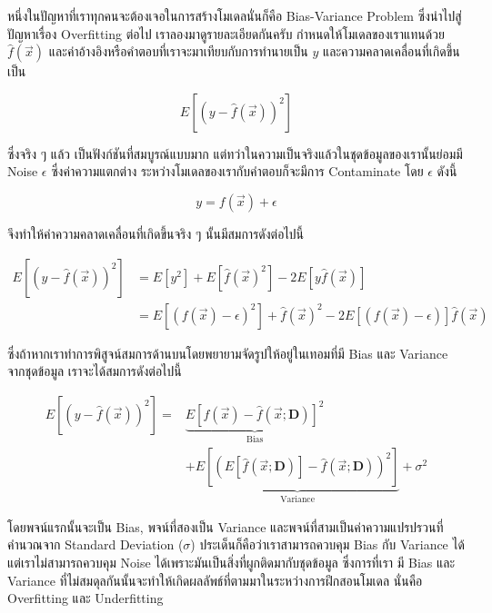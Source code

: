 หนึ่งในปัญหาที่เราทุกคนจะต้องเจอในการสร้างโมเดลนั่นก็คือ Bias-Variance Problem ซึ่งนำไปสู่ปัญหาเรื่อง Overfitting ต่อไป
เราลองมาดูรายละเอียดกันครับ กำหนดให้โมเดลของเราแทนด้วย $\hat{f}(\vec{x})$ และค่าอ้างอิงหรือคำตอบที่เราจะมาเทียบกับการทำนายเป็น 
$y$ และความคลาดเคลื่อนที่เกิดขึ้นเป็น

\begin{equation}
    E\left[\left(y - \hat{f}(\vec{x})\right)^2\right]
\end{equation}

ซึ่งจริง ๆ แล้ว เป็นฟังก์ชันที่สมบูรณ์แบบมาก แต่ทว่าในความเป็นจริงแล้วในชุดข้อมูลของเรานั้นย่อมมี Noise $\epsilon$ ซึ่งค่าความแตกต่าง%
ระหว่างโมเดลของเรากับคำตอบก็จะมีการ Contaminate โดย $\epsilon$ ดังนี้

\begin{equation}
    y = f(\vec{x}) + \epsilon
\end{equation}

\noindent จึงทำให้ค่าความคลาดเคลื่อนที่เกิดขึ้นจริง ๆ นั้นมีสมการดังต่อไปนี้ 

\begin{align}
    E\left[\left(y - \hat{f}(\vec{x})\right)^2\right] &= 
    E\left[y^2\right] + E\left[\hat{f}(\vec{x})^2\right] - 2 E\left[y\hat{f}(\vec{x})\right] \\
    &= E\left[\left(f(\vec{x}) - \epsilon\right)^2\right] + \hat{f}(\vec{x})^2 - 2 E\left[\left(f(\vec{x}) - 
    \epsilon\right)\right]\hat{f}(\vec{x})
\end{align}

\noindent ซึ่งถ้าหากเราทำการพิสูจน์สมการด้านบนโดยพยายามจัดรูปให้อยู่ในเทอมที่มี Bias และ Variance จากชุดข้อมูล เราจะได้สมการดังต่อไปนี้

\begin{align}\label{eq:bias_variance}
E\left[\left(y - \hat{f}(\vec{x})\right)^2\right] = 
    & \underbrace{E\left[f(\vec{x}) - \hat{f}\left(\vec{x}; \mathbf{D}\right)\right]^2}_{\text{Bias}} \nonumber \\
    & + \underbrace{E\left[\left(E\left[\hat{f}\left(\vec{x}; \mathbf{D}\right)\right] - 
    \hat{f}\left(\vec{x}; \mathbf{D}\right)\right)^2\right]}_{\text{Variance}} + \sigma^2
\end{align}

โดยพจน์แรกนั้นจะเป็น Bias, พจน์ที่สองเป็น Variance และพจน์ที่สามเป็นค่าความแปรปรวนที่คำนวณจาก Standard Deviation ($\sigma$)
ประเด็นก็คือว่าเราสามารถควบคุม Bias กับ Variance ได้ แต่เราไม่สามารถควบคุม Noise ได้เพราะมันเป็นสิ่งที่ผูกติดมากับชุดข้อมูล ซึ่งการที่เรา%
มี Bias และ Variance ที่ไม่สมดุลกันนั้นจะทำให้เกิดผลลัพธ์ที่ตามมาในระหว่างการฝึกสอนโมเดล นั่นคือ Overfitting และ Underfitting

